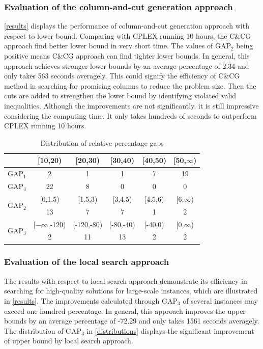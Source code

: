 \documentclass[11pt,nonblindrev,fleqn]{article}
\begin{document}
\subsubsection{Evaluation of the column-and-cut generation approach}
\autoref{results} displays the performance of column-and-cut generation approach with respect to lower bound. Comparing with CPLEX running 10 hours, the C\&CG approach find better lower bound in very short time. The values of GAP$_2$ being positive means C\&CG approach can find tighter lower bounds. In general, this approach achieves stronger lower bounds by an average percentage of 2.34 and only takes 563 seconds averagely. This could signify the efficiency of C\&CG method in searching for promising columns to reduce the problem size. Then the cuts are added to strengthen the lower bound by identifying violated valid inequalities. Although the improvements are not significantly, it is still impressive considering the computing time. It only takes hundreds of seconds to outperform CPLEX running 10 hours.

\begin{table}[H]
\setlength{\abovecaptionskip}{-3pt}
\setlength{\belowcaptionskip}{5pt}
\centering
  \footnotesize
  \caption{Distribution of relative percentage gaps}
  \label{distributions}

\begin{tabular}{cccccc}
\hline
      & [10,20) & [20,30) & [30,40) & [40,50) & [50,$\infty$) \bigstrut\\
\hline
GAP$_1$ & 2     & 1     & 1     & 7     & 19 \bigstrut[t]\\
GAP$_4$ & 22    & 8     & 0     & 0     & 0 \bigstrut[b]\\
\hline
\multirow{2}[4]{*}{GAP$_2$} & [0,1.5) & [1.5,3) & [3,4.5) & [4.5,6) & [6,$\infty$) \bigstrut\\
\cline{2-6}      & 13    & 7     & 7     & 1     & 2 \bigstrut\\
\hline
\multirow{2}[4]{*}{GAP$_3$} & [$-\infty$,-120) & [-120,-80) & [-80,-40) & [-40,0) & [0,$\infty$) \bigstrut\\
\cline{2-6}      & 2     & 11    & 13    & 2     & 2 \bigstrut\\
\hline
\end{tabular}%

\end{table}%

\subsubsection{Evaluation of the local search approach}
The results with respect to local search approach demonstrate its efficiency in searching for high-quality solutions for large-scale instances, which are illustrated in \autoref{results}. The improvements calculated through GAP$_3$ of several instances may exceed one hundred percentage. In general, this approach improves the upper bounds by an average percentage of -72.29 and only takes 1561 seconds averagely. The distribution of GAP$_3$ in \autoref{distributions} displays the significant improvement of upper bound by local search approach.
\end{document}
